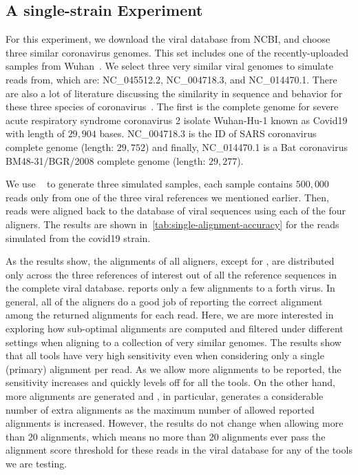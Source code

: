 \subsection{A single-strain Experiment}

For this experiment, we download the viral database from NCBI,
and choose three similar coronavirus genomes.
This set includes one of the recently-uploaded samples from Wuhan~\citep{wu2020new,baranov2005programmed}.
We select three very similar viral genomes to simulate reads from, which are: NC\_045512.2, NC\_004718.3, 
and NC\_014470.1. There are also a lot of literature discussing the similarity in sequence and behavior for 
these three species of coronavirus~\citep{wang2020unique,zhang2020probable,tang2020origin}.
The first is the complete genome for severe acute respiratory syndrome coronavirus 2 isolate Wuhan-Hu-1
known as Covid19 with length of $29,904$ bases. NC\_004718.3 is the ID of SARS coronavirus complete genome 
(length: $29,752$) and finally, NC\_014470.1 is a Bat coronavirus BM48-31/BGR/2008 complete genome 
(length: $29,277$).

We use \mason~\citep{holtgrewe2010mason} to generate three simulated samples,
each sample contains $500,000$ reads only from one of the three viral references 
we mentioned earlier. Then, reads were aligned back to the database of viral 
sequences using each of the four aligners. The results are shown in~\cref{tab:single-alignment-accuracy} 
for the reads simulated from the covid19 strain.

As the results show, the alignments of all aligners, except for \debga, are distributed only 
across the three references of interest out of all the reference sequences in the complete viral database.
\debga reports only a few alignments to a forth virus.  In general, all of the aligners do 
a good job of reporting the correct alignment among the returned alignments for each read.
Here, we are more interested in exploring how sub-optimal alignments are computed and 
filtered under different settings when aligning to a collection of very similar genomes.
The results show that all tools have very high sensitivity even when considering only 
a single (primary) alignment per read.  As we allow more alignments to be reported, 
the sensitivity increases and quickly levels off for all the tools.  On the other hand, 
more alignments are generated and \bt, in particular, generates a considerable number 
of extra alignments as the maximum number of allowed reported alignments is increased.
However, the results do not change when allowing more than 20 alignments, 
which means no more than 20 alignments ever pass the alignment score threshold for these reads in the 
viral database for any of the tools we are testing. 
    
